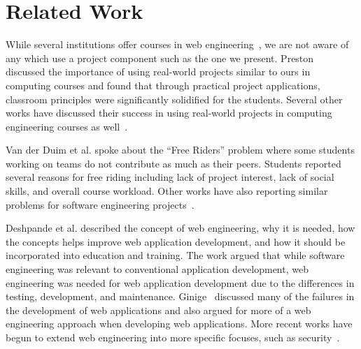 \documentclass[conference]{IEEEtran}
\begin{document}
\section{Related Work}
\label{sec: relatedwork}

%


While several institutions offer courses in web engineering~\cite{tufts_webengineering,csun_webengineering}, we are not aware of any which use a project component such as the one we present. Preston~\cite{Preston:2005:UAR:1869667.1869671} discussed the importance of using real-world projects similar to ours in computing courses and found that through practical project applications, classroom principles were significantly solidified for the students. Several other works have discussed their success in using real-world projects in computing engineering courses as well~\cite{Krutz:2014:URW:2538862.2538955, MacKellar:2011:SEC:1968521.1968542, Nordio:2011:TSE:1984665.1984673}.

Van der Duim et al.\cite{VanderDuim:2007:GPE:1248820.1248900} spoke about the ``Free Riders'' problem where some students working on teams do not contribute as much as their peers. Students reported several reasons for free riding including lack of project interest, lack of social skills, and overall course workload. Other works have also reporting similar problems for software engineering projects~\cite{RePEc:dgr:rugsom:03a42,Hazzan03teachinga}.

Deshpande et al.\cite{Deshpande:2002:WE:2011098.2011101} described the concept of web engineering, why it is needed, how the concepts helps improve web application development, and how it should be incorporated into education and training. The work argued that while software engineering was relevant to conventional application development, web engineering was needed for web application development due to the differences in testing, development, and maintenance. Ginige~\cite{Ginige:2002:WEM:568760.568885} discussed many of the failures in the development of web applications and also argued for more of a web engineering approach when developing web applications. More recent works have begun to extend web engineering into more specific focuses, such as security~\cite{Aljawarneh201112}.
\end{document}
